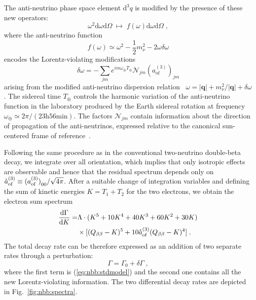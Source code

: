 The anti-neutrino phase space element $\text{d}^3q$ is modified by the presence
of these new operators:
\begin{equation}
  \omega^2\text{d}\omega\text{d}\Omega \;\longmapsto\;
    f(\omega)\text{d}\omega\text{d}\Omega\;,
\end{equation}
where the anti-neutrino function
\begin{equation}
  f(\omega)\simeq\omega^2-\frac{1}{2}m_\nu^2-2\omega\delta\omega
\end{equation}
encodes the Lorentz-violating modifications
\begin{equation}
  \delta\omega = -\sum_{jm} e^{im\omega_\oplus T_\oplus}
    \mathcal{N}_{jm}(a_\text{of}^{(3)})_{jm}
\end{equation}
arising from the modified anti-neutrino dispersion relation~\cite{Kostelecky2012}
$\omega=|\mathbf{q}|+m_\nu^2/|\mathbf{q}|+\delta\omega$. The sidereal time
$T_\oplus$ controls the harmonic variation of the anti-neutrino function in the
laboratory produced by the Earth sidereal rotation at frequency
$\omega_\oplus\simeq 2\pi/(23\text{h} 56\text{min})$. The factors
$\mathcal{N}_{jm}$ contain information about the direction of propagation of
the anti-neutrinos, expressed relative to the canonical sun-centered frame of
reference~\cite{Bluhm2003, Kostelecky2002}.

Following the same procedure as in the conventional two-neutrino double-beta
decay, we integrate over all orientation, which implies that only isotropic
effects are observable and hence that the residual spectrum depends only on
$\mathring{a}_\text{of}^{(3)}\equiv{(a_\text{of}^{(3)})}_{00}/\sqrt{4\pi}$. After a suitable change of
integration variables and defining the sum of kinetic energies $K=T_1+T_2$ for
the two electrons, we obtain the electron sum spectrum
\begin{equation}\label{eq:nbb:totwidth}
  \begin{split}
    \frac{\text{d}\Gamma}{\text{d}K} =&
      \Lambda \cdot(K^5+10K^4+40K^3+60K^2+30K) \\
      & \times[(Q_{\beta\beta}-K)^5+10\mathring{a}_\text{of}^{(3)}(Q_{\beta\beta}-K)^4] \;. \\
  \end{split}
\end{equation}
The total decay rate can be therefore expressed as an addition of two separate
rates through a perturbation:
\begin{equation}
  \Gamma = \Gamma_0+\delta\Gamma \;,
\end{equation}
where the first term is (\ref{eq:nbb:stdmodel}) and the second one contains all the
new Lorentz-violating information. The two differential decay rates are
depicted in Fig.~\ref{fig:nbb:spectra}.

